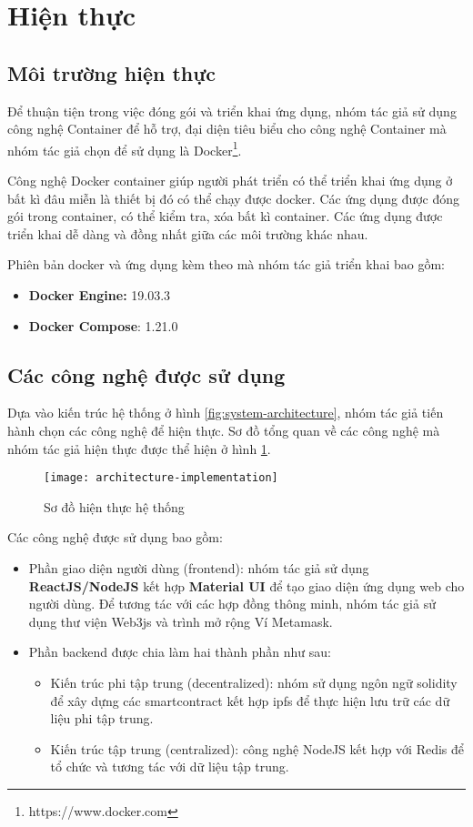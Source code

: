\documentclass[../main-report.tex]{subfiles}
\begin{document}
\section{Hiện thực}
\subsection{Môi trường hiện thực}
Để thuận tiện trong việc đóng gói và triển khai ứng dụng, nhóm tác giả sử dụng công nghệ Container để hỗ trợ, đại diện tiêu biểu cho công nghệ Container mà nhóm tác giả chọn để sử dụng là Docker\footnote{https://www.docker.com}.

Công nghệ Docker container giúp người phát triển có thể triển khai ứng dụng ở bất kì đâu miễn là thiết bị đó có thể chạy được docker. Các ứng dụng được đóng gói trong container, có thể kiểm tra, xóa bất kì container. Các ứng dụng được triển khai dễ dàng và đồng nhất giữa các môi trường khác nhau.

Phiên bản docker và ứng dụng kèm theo mà nhóm tác giả triển khai bao gồm:

\begin{itemize}
\item \textbf{Docker Engine:} 19.03.3
\item \textbf{Docker Compose}: 1.21.0
\end{itemize}

\subsection{Các công nghệ được sử dụng}
Dựa vào kiến trúc hệ thống ở hình \ref{fig:system-architecture}, nhóm tác giả tiến hành chọn các công nghệ để hiện thực. Sơ đồ tổng quan về các công nghệ mà nhóm tác giả hiện thực được thể hiện ở hình \ref{fig:architecture-implementation}.

\begin{figure}[ht!]
\begin{center}
\label{fig:architecture-implementation}
\texttt{[image: architecture-implementation]}
\caption{Sơ đồ hiện thực hệ thống}
\end{center}
\end{figure}

Các công nghệ được sử dụng bao gồm:
\begin{itemize}
\item Phần giao diện người dùng (\gls{frontend}): nhóm tác giả sử dụng \textbf{ReactJS/NodeJS} kết hợp \textbf{Material UI} để tạo giao diện ứng dụng web cho người dùng. Để tương tác với các hợp đồng thông minh, nhóm tác giả sử dụng thư viện Web3js và trình mở rộng Ví Metamask.
\item Phần \gls{backend} được chia làm hai thành phần như sau:
\begin{itemize}
 \item Kiến trúc phi tập trung (decentralized): nhóm sử dụng ngôn ngữ solidity để xây dựng các \gls{smartcontract} kết hợp \acrshort{ipfs} để thực hiện lưu trữ các dữ liệu phi tập trung.
 \item Kiến trúc tập trung (centralized): công nghệ NodeJS kết hợp với Redis để tổ chức và tương tác với dữ liệu tập trung.
 \end{itemize} 
\end{itemize}
\end{document}
